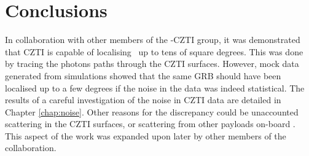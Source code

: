 \section{Conclusions}
\label{sec:conlusions--localisation}
In collaboration with other members of the \AS -CZTI group, it was demonstrated that CZTI is capable of localising \grb\ up to tens of square degrees. This was done by tracing the photons paths through the CZTI surfaces. However, mock data generated from simulations showed that the same GRB should have been localised up to a few degrees if the noise in the data was indeed statistical. The results of a careful investigation of the noise in CZTI data are detailed in Chapter \ref{chap:noise}. Other reasons for the discrepancy could be unaccounted scattering in the CZTI surfaces, or scattering from other payloads on-board \AS. This aspect of the work was expanded upon later by other members of the collaboration.